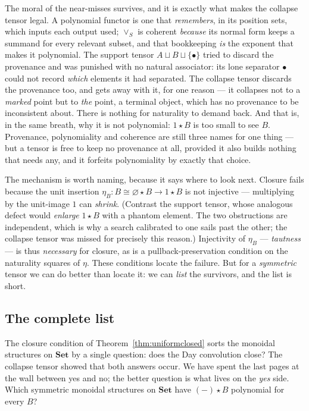\documentclass[11pt,a4paper]{book}
\newcommand{\Set}{\mathbf{Set}}
\theoremstyle{plain}
\theoremstyle{definition}
\theoremstyle{remark}
\begin{document}
\begin{teachbox}
The moral of the near-misses survives, and it is exactly what makes the collapse
tensor legal. A polynomial functor is one that \emph{remembers}, in its position
sets, which inputs each output used; $\vee_S$ is coherent \emph{because} its normal
form keeps a summand for every relevant subset, and that bookkeeping \emph{is} the
exponent that makes it polynomial. The support tensor
$A\sqcup B\sqcup\{\bullet\}$ tried to discard the provenance and was punished with
no natural associator: its lone separator $\bullet$ could not record \emph{which}
elements it had separated. The collapse tensor discards the provenance too, and
gets away with it, for one reason --- it collapses not to a \emph{marked} point but
to \emph{the} point, a terminal object, which has no provenance to be inconsistent
about. There is nothing for naturality to demand back. And that is, in the same
breath, why it is not polynomial: $1\star B$ is too small to see $B$. Provenance,
polynomiality and coherence are still three names for one thing --- but a tensor is
free to keep no provenance at all, provided it also builds nothing that needs any,
and it forfeits polynomiality by exactly that choice.
\end{teachbox}

The mechanism is worth naming, because it says where to look next. Closure fails
because the unit insertion $\eta_B\colon B\cong\varnothing\star B\to 1\star B$ is
not injective --- multiplying by the unit-image $1$ can \emph{shrink}. (Contrast
the support tensor, whose analogous defect would \emph{enlarge} $1\star B$ with a
phantom element. The two obstructions are independent, which is why a search
calibrated to one sails past the other; the collapse tensor was missed for
precisely this reason.) Injectivity of $\eta_B$ --- \emph{tautness} --- is thus
\emph{necessary} for closure, as is a pullback-preservation condition on the
naturality squares of $\eta$. These conditions locate the failure. But for a
\emph{symmetric} tensor we can do better than locate it: we can \emph{list} the
survivors, and the list is short.

\subsection{The complete list}
\label{sec:classification}

The closure condition of Theorem~\ref{thm:uniformclosed} sorts the monoidal
structures on $\Set$ by a single question: does the Day convolution close? The
collapse tensor showed that both answers occur. We have spent the last pages at the
wall between yes and no; the better question is what lives on the \emph{yes} side.
Which symmetric monoidal structures on $\Set$ have $(-)\star B$ polynomial for every
$B$?
\end{document}

